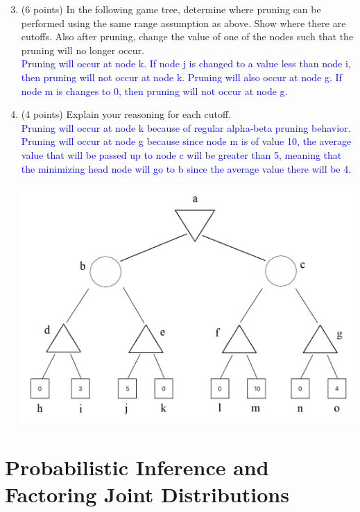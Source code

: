 \documentclass[12pt]{article}
\newenvironment{qparts}{\begin{enumerate}[{(}a{)}]}{\end{enumerate}}
\begin{document}
\begin{qparts}
  \setcounter{enumi}{2}
  \item (6 points) In the following game tree, determine where pruning can be performed
  using the same range assumption as above.  Show where there are cutoffs. Also after pruning, change the value of one of the nodes such that the pruning will no longer occur.\\
  \textcolor{blue}{Pruning will occur at node k. If node j is changed to a value less than node i, then pruning will not occur at node k. Pruning will also occur at node g. If node m is changes to 0, then pruning will not occur at node g.}
  \item (4 points) Explain your reasoning for each cutoff.\\
  \textcolor{blue}{Pruning will occur at node k because of regular alpha-beta pruning behavior. Pruning will occur at node g because since node m is of value 10, the average value that will be passed up to node c will be greater than 5, meaning that the minimizing head node will go to b since the average value there will be 4.}
  \begin{center}
    \includegraphics[width=6in]{q3-Pruning-with-Chance-Nodes.png}
  \end{center}

\end{qparts}
\newpage
\section{Probabilistic Inference and Factoring Joint Distributions}
\end{document}
